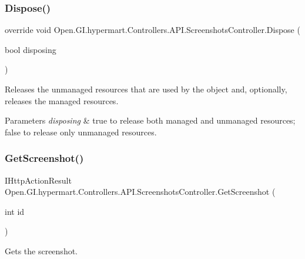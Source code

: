 \subsubsection{\texorpdfstring{Dispose()}{Dispose()}}
{\footnotesize\ttfamily override void Open.\+G\+I.\+hypermart.\+Controllers.\+A\+P\+I.\+Screenshots\+Controller.\+Dispose (\begin{DoxyParamCaption}\item[{bool}]{disposing }\end{DoxyParamCaption})\hspace{0.3cm}{\ttfamily [protected]}}



Releases the unmanaged resources that are used by the object and, optionally, releases the managed resources. 


\begin{DoxyParams}{Parameters}
{\em disposing} & true to release both managed and unmanaged resources; false to release only unmanaged resources.\\
\hline
\end{DoxyParams}
\hypertarget{class_open_1_1_g_i_1_1hypermart_1_1_controllers_1_1_a_p_i_1_1_screenshots_controller_abfe715c661c5a7a53ac5a382ff24b354}{}\label{class_open_1_1_g_i_1_1hypermart_1_1_controllers_1_1_a_p_i_1_1_screenshots_controller_abfe715c661c5a7a53ac5a382ff24b354} 
\subsubsection{\texorpdfstring{Get\+Screenshot()}{GetScreenshot()}}
{\footnotesize\ttfamily I\+Http\+Action\+Result Open.\+G\+I.\+hypermart.\+Controllers.\+A\+P\+I.\+Screenshots\+Controller.\+Get\+Screenshot (\begin{DoxyParamCaption}\item[{int}]{id }\end{DoxyParamCaption})}



Gets the screenshot. 


